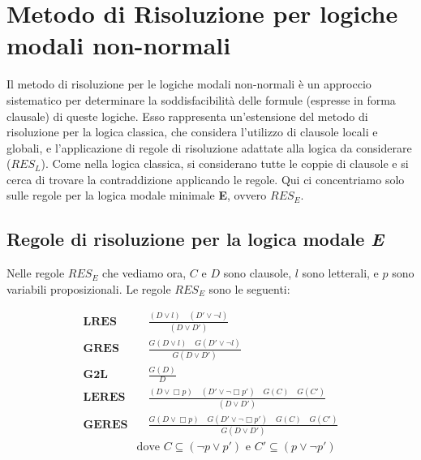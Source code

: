 \documentclass[a4paper,12pt]{report}
\begin{document}
\section{Metodo di Risoluzione per logiche modali non-normali}
Il metodo di risoluzione per le logiche modali non-normali è un approccio sistematico per determinare la soddisfacibilità delle formule (espresse in forma clausale) di queste logiche. Esso rappresenta un'estensione del metodo di risoluzione per la logica classica, che considera l'utilizzo di clausole locali e globali, e l'applicazione di regole di risoluzione adattate alla logica da considerare ($RES_L$). Come nella logica classica, si considerano tutte le coppie di clausole e si cerca di trovare la contraddizione applicando le regole. Qui ci concentriamo solo sulle regole per la logica modale minimale \textbf{E}, ovvero $RES_E$.

\subsection{Regole di risoluzione per la logica modale \emph{E}}
Nelle regole $RES_E$ che vediamo ora, $C$ e $D$ sono clausole, $l$ sono letterali, e $p$ sono variabili proposizionali. Le regole $RES_E$ sono le seguenti:




    

\begin{align*}
    \textbf{LRES} & \quad \frac{(D \lor l) \quad (D' \lor \lnot l)}{(D \lor D')} \\[10pt]
    \textbf{GRES} & \quad \frac{G(D \lor l) \quad G(D' \lor \lnot l)}{G(D \lor D')} \\[10pt]
    \textbf{G2L} & \quad \frac{G(D)}{D} \\[10pt]
    \textbf{LERES} & \quad \frac{(D \lor \Box p) \quad (D' \lor \lnot \Box p') \quad G(C) \quad G(C')}{(D \lor D')} \\[10pt]
    \textbf{GERES} & \quad \frac{G(D \lor \Box p) \quad G(D' \lor \lnot \Box p') \quad G(C) \quad G(C')}{G(D \lor D')} \\[10pt]
    & \text{dove } C \subseteq (\lnot p \lor p') \text{ e } C' \subseteq (p \lor \lnot p')
\end{align*}
\end{document}
